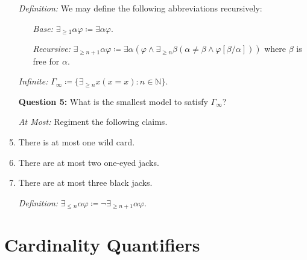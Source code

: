 \documentclass[a4paper, 11pt]{article} %
\newcommand{\set}[1]{\lbrace#1\rbrace} %
\newcommand{\qt}[2]{#1 #2} %
\newcommand{\unisub}[2]{[#1/#2]}
\begin{document}
\begin{enumerate}
  \item[\it Definition:] We may define the following abbreviations recursively:
    \begin{itemize}
      \item[\it Base:] $\qt{\exists_{\geq 1}}{\alpha}\varphi \coloneq \qt{\exists}{\alpha}\varphi$.
      \item[\it Recursive:] $\qt{\exists_{\geq n+1}}{\alpha}\varphi \coloneq \qt{\exists}{\alpha}(\varphi \wedge \qt{\exists_{\geq n}}{\beta}(\alpha \neq \beta \wedge \varphi\unisub{\beta}{\alpha}))$ where $\beta$ is free for $\alpha$. 
    \end{itemize}
  \item[\it Infinite:] $\Gamma_{\infty} \coloneq \set{\qt{\exists_{\geq n}}{x}(x=x): n\in\mathbb{N}}$.
  \item[\bf Question 5:] What is the smallest model to satisfy $\Gamma_\infty$?
  \item[\it At Most:] Regiment the following claims.
  \item There is at most one wild card.
  \item There are at most two one-eyed jacks.
  \item There are at most three black jacks.
  \item[\it Definition:] $\qt{\exists_{\leq n}}{\alpha}\varphi \coloneq \neg\qt{\exists_{\geq n+1}}{\alpha}\varphi$.
\end{enumerate}
 
 





\section*{Cardinality Quantifiers}
 
\end{document}
